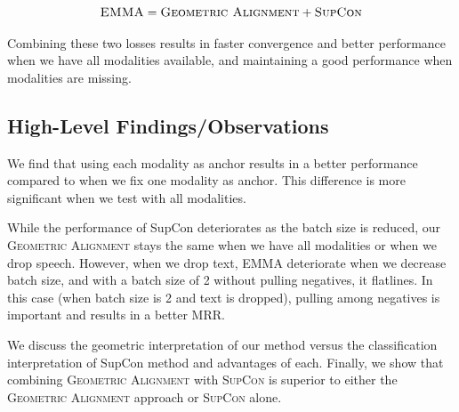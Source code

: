 \documentclass[10pt]{article} %
\newcommand{\ours}{\textsc{EMMA}}
\newcommand{\geom}{\textsc{Geometric Alignment}}
\newcommand{\supcon}{\textsc{SupCon}}
\begin{document}
\begin{equation}\label{eq:emma}
    \ours{} = \geom{} + \supcon{}
\end{equation}

Combining these two losses results in faster convergence and better performance when we have all modalities available, and maintaining a good performance when modalities are missing.

\subsection{High-Level Findings/Observations}
We find that using each modality as anchor results in a better performance compared to when we fix one modality as anchor. This difference is more significant when we test with all modalities.

While the performance of SupCon deteriorates as the batch size is reduced, our \geom{} stays the same when we have all modalities or when we drop speech. However, when we drop text, EMMA deteriorate when we decrease batch size, and with a batch size of 2 without pulling negatives, it flatlines. In this case (when batch size is 2 and text is dropped), pulling among negatives is important and results in a better MRR.


We discuss the geometric interpretation of our method versus the classification interpretation of SupCon method and advantages of each.
Finally, we show that combining \geom{} with \supcon{} is superior to either the \geom{} approach or \supcon{} alone.
\end{document}
